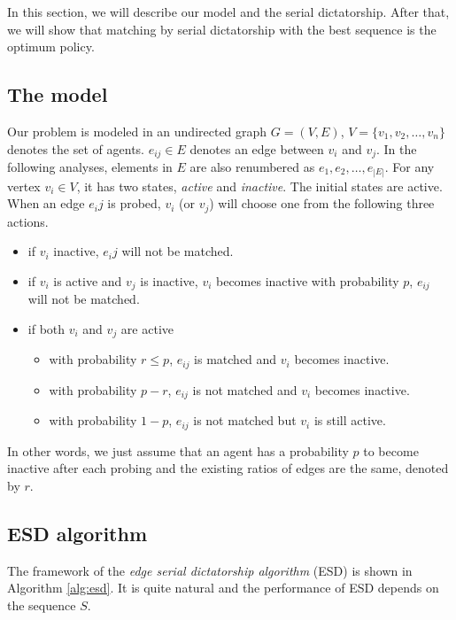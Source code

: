 \documentclass[letterpaper]{article}
\begin{document}
In this section, we will describe our model and the serial dictatorship. After that, we will show that matching by serial dictatorship with the best sequence is the optimum policy.

\subsection{The model}

Our problem is modeled in an undirected graph $G=(V,E)$, $V=\{v_1,v_2,\ldots,v_n\}$ denotes the set of agents. $e_{ij}\in E$ denotes an edge between $v_i$ and $v_j$. In the following analyses, elements in $E$ are also renumbered as $e_1,e_2,\ldots,e_{|E|}$. 
For any vertex $v_i\in V$, it has two states, \textit{active} and \textit{inactive}.
The initial states are active.
When an edge $e_ij$ is probed, $v_i$ (or $v_j$) will choose one from the following three actions.
\begin{itemize}
	\item if $v_i$ inactive, $e_ij$ will not be matched.
	\item if $v_i$ is active and $v_j$ is inactive, $v_i$ becomes inactive with probability $p$, $e_{ij}$ will not be matched.
	\item if both $v_i$ and $v_j$ are active
	\begin{itemize}
		\item with probability $r\leq p$, $e_{ij}$ is matched and $v_i$ becomes inactive.
		\item with probability $p-r$, $e_{ij}$ is not matched and $v_i$ becomes inactive.
		\item with probability $1-p$, $e_{ij}$ is not matched but $v_i$ is still active.
	\end{itemize}
\end{itemize} 

In other words, we just assume that an agent has a probability $p$ to become inactive after each probing and the existing ratios of edges are the same, denoted by $r$.


\subsection{ESD algorithm}

The framework of the \textit{edge serial dictatorship algorithm} (ESD) is shown in Algorithm \ref{alg:esd}.
It is quite natural and the performance of ESD depends on the sequence $S$.
\end{document}
